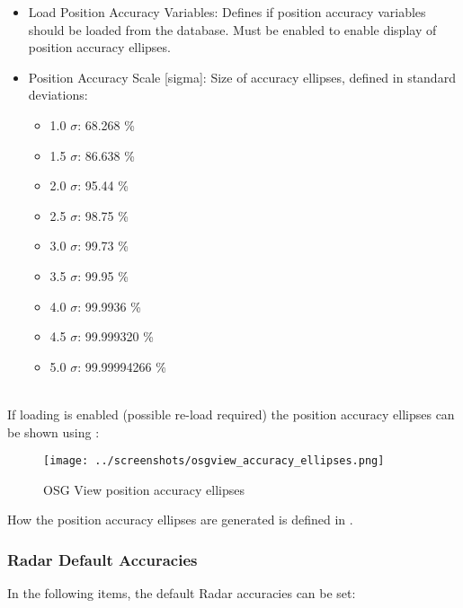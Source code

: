 \begin{itemize}
 \item Load Position Accuracy Variables: Defines if position accuracy variables should be loaded from the database. Must be enabled to enable display of position accuracy ellipses.
 \item Position Accuracy Scale [sigma]: Size of accuracy ellipses, defined in standard deviations:
 \begin{itemize}
    \item 1.0 $\sigma$: 68.268 \%
    \item 1.5 $\sigma$: 86.638 \%
    \item 2.0 $\sigma$: 95.44 \%
    \item 2.5 $\sigma$: 98.75 \%
    \item 3.0 $\sigma$: 99.73 \%
    \item 3.5 $\sigma$: 99.95 \%
    \item 4.0 $\sigma$: 99.9936 \%
    \item 4.5 $\sigma$: 99.999320 \%
    \item 5.0 $\sigma$: 99.99994266 \%
\end{itemize}  
\end{itemize}
\ \\

If loading is enabled (possible re-load required) the position accuracy ellipses can be shown using :

\begin{figure}[H]
    \hspace*{-2.5cm}
    \texttt{[image: ../screenshots/osgview\_accuracy\_ellipses.png]}
  \caption{OSG View position accuracy ellipses}
\end{figure} 

How the position accuracy ellipses are generated is defined in .

\subsubsection{Radar Default Accuracies}
\label{sec:others_radar_default_accuracies}

In the following items, the default Radar accuracies can be set:

